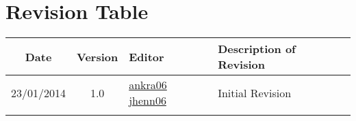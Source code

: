 \chapter{Revision Table}

\begin{savenotes}
	\begin{table}[H]
		
		\centering
			\begin{tabular}{c|c|p{1.1cm}|p{9.6cm}}
				\textbf{Date} & \textbf{Version} & \textbf{Editor} & \textbf{Description of Revision}\\
				\hline
				
				23/01/2014	& 1.0	& \href{mailto:anders@krauthammer.dk}{ankra06} 
														\href{mailto:jon@henneberg.cc}{jhenn06} 		& 
				Initial Revision \\
				
				&&& 
				
				
				
	
			\end{tabular}
		\label{revisionTable}
	\end{table}
\end{savenotes}